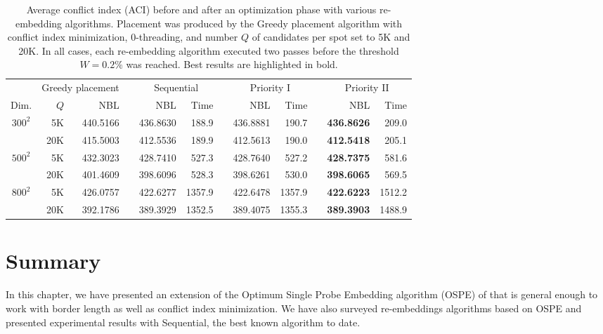 \begin{table}[t]\centering
\caption{\label{tab:priority_ci}
  Average conflict index (ACI) before and after an optimization phase with
  various re-embedding algorithms. Placement was produced by the Greedy
  placement algorithm with conflict index minimization, $0$-threading, and number
  $Q$ of candidates per spot set to 5K and 20K. In all cases, each re-embedding
  algorithm executed two passes before the threshold $W=0.2\%$ was reached. Best
  results are highlighted in bold.}
\footnotesize{
\begin{tabular}{crrlrrlrrlrr}
\vspace{1pt}
     & \multicolumn{2}{c}{Greedy placement} & & \multicolumn{2}{c}{Sequential} & & \multicolumn{2}{c}{Priority I} & & \multicolumn{2}{c}{Priority II} \\ \cline{2-3} \cline{5-6} \cline{8-9} \cline{11-12}
\vspace{1pt}
Dim. & $Q$ & NBL & & NBL & Time & & NBL & Time & & NBL & Time \\
\hline
$300^2$ &  5K & 440.5166 &  & 436.8630 &  188.9 &  & 436.8881 &  190.7 &  & {\bf 436.8626} &  209.0 \\
                & 20K & 415.5003 &  & 412.5536 &  189.9 &  & 412.5613 &  190.0 &  & {\bf 412.5418} &  205.1 \\
\hline
$500^2$ &  5K & 432.3023 &  & 428.7410 &  527.3 &  & 428.7640 &  527.2 &  & {\bf 428.7375} &  581.6 \\
                & 20K & 401.4609 &  & 398.6096 &  528.3 &  & 398.6261 &  530.0 &  & {\bf 398.6065} &  569.5 \\
\hline
$800^2$ &  5K & 426.0757 &  & 422.6277 & 1357.9 &  & 422.6478 & 1357.9 &  & {\bf 422.6223} & 1512.2 \\
                & 20K & 392.1786 &  & 389.3929 & 1352.5 &  & 389.4075 & 1355.3 &  & {\bf 389.3903} & 1488.9 \\
\hline
\end{tabular}}
\end{table}

\section{Summary}
\label{sec:reembed_summary}

In this chapter, we have presented an extension of the Optimum Single Probe
Embedding algorithm (OSPE) of \citet{Kahng2002} that is general enough to work
with border length as well as conflict index minimization. We have also surveyed
re-embeddings algorithms based on OSPE and presented experimental results with
Sequential, the best known algorithm to date.

